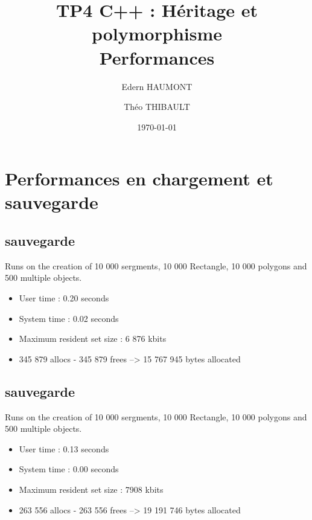 \documentclass[a4paper, 12pts]{article}
\title{TP4 C++ : Héritage et polymorphisme \\
    \large Performances}
\author{Edern HAUMONT}
\author{Théo THIBAULT}
\affil{B3133}
\date{\today}
\begin{document}

\maketitle



\section{Performances en chargement et sauvegarde}

    \subsection{sauvegarde}
    Runs on the creation of 10 000 sergments, 10 000 Rectangle, 10 000 polygons and 500 multiple objects.
        \begin{itemize}
            \item User time : 0.20 seconds
            \item System time : 0.02 seconds
            \item Maximum resident set size : 6 876 kbits
            \item 345 879 allocs - 345 879 frees --> 15 767 945 bytes allocated
        \end{itemize}

\subsection{sauvegarde}
    Runs on the creation of 10 000 sergments, 10 000 Rectangle, 10 000 polygons and 500 multiple objects.
        \begin{itemize}
            \item User time : 0.13 seconds
            \item System time : 0.00 seconds
            \item Maximum resident set size : 7908 kbits
            \item 263 556 allocs - 263 556 frees --> 19 191 746 bytes allocated
        \end{itemize}
\end{document}
